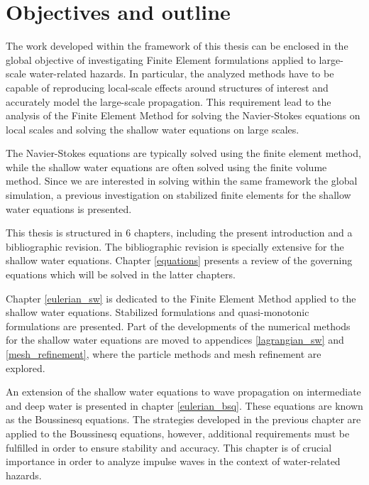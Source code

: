 \section{Objectives and outline}


The work developed within the framework of this thesis can be enclosed in the global objective of investigating Finite Element formulations applied to large-scale water-related hazards. In particular, the analyzed methods have to be capable of reproducing local-scale effects around structures of interest and accurately model the large-scale propagation. This requirement lead to the analysis of the Finite Element Method for solving the Navier-Stokes equations on local scales and solving the shallow water equations on large scales.

The Navier-Stokes equations are typically solved using the finite element method, while the shallow water equations are often solved using the finite volume method.
Since we are interested in solving within the same framework the global simulation, a previous investigation on stabilized finite elements for the shallow water equations is presented.


This thesis is structured in 6 chapters, including the present introduction and a bibliographic revision. The bibliographic revision is specially extensive for the shallow water equations.
Chapter \ref{equations} presents a review of the governing equations which will be solved in the latter chapters.

Chapter \ref{eulerian_sw} is dedicated to the Finite Element Method applied to the shallow water equations. Stabilized formulations and quasi-monotonic formulations are presented.
Part of the developments of the numerical methods for the shallow water equations are moved to appendices \ref{lagrangian_sw} and \ref{mesh_refinement}, where the particle methods and mesh refinement are explored.

An extension of the shallow water equations to wave propagation on intermediate and deep water is presented in chapter \ref{eulerian_bsq}. These equations are known as the Boussinesq equations. The strategies developed in the previous chapter are applied to the Boussinesq equations, however, additional requirements must be fulfilled in order to ensure stability and accuracy. This chapter is of crucial importance in order to analyze impulse waves in the context of water-related hazards.

